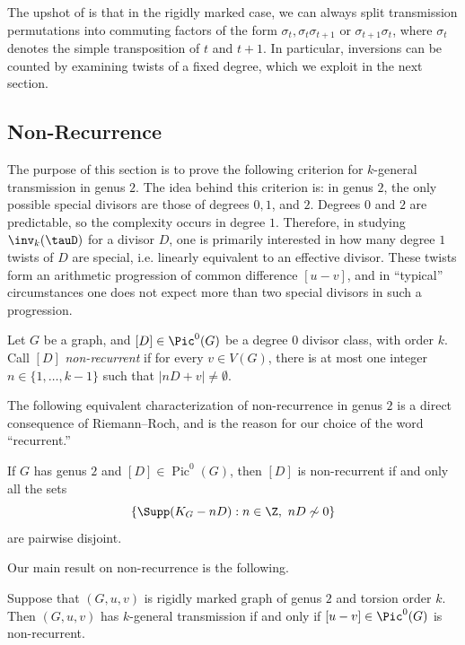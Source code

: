 The upshot of  is that in the rigidly marked case, we can always split transmission permutations into commuting factors of the form $\sigma_t, \sigma_t\sigma_{t+1}$ or $\sigma_{t+1}\sigma_t$, where $\sigma_t$ denotes the simple transposition of $t$ and $t+1$. In particular, inversions can be counted by examining twists of a fixed degree, which we exploit in the next section.


\subsection{Non-Recurrence}

The purpose of this section is to prove the following criterion for $k$-general transmission in genus $2$. The idea behind this criterion is: in genus $2$, the only possible special divisors are those of degrees $0,1$, and $2$. Degrees $0$ and $2$ are predictable, so the complexity occurs in degree $1$. Therefore, in studying $\inv_k(\tauD)$ for a divisor $D$, one is primarily interested in how many degree $1$ twists of $D$ are special, i.e. linearly equivalent to an effective divisor. These twists form an arithmetic progression of common difference $[u-v]$, and in ``typical'' circumstances one does not expect more than two special divisors in such a progression.

\begin{defi}
Let $G$ be a graph, and $[D] \in \Pic^0(G)$ be a degree $0$ divisor class, with order $k$. Call $[D]$ \emph{non-recurrent} if for every $v \in V(G)$, there is at most one integer $n \in \{1,\ldots,k-1\}$ such that $|nD + v| \neq \emptyset$.
\end{defi}

The following equivalent characterization of non-recurrence in genus $2$ is a direct consequence of Riemann--Roch, and is the reason for our choice of the word ``recurrent.''

\begin{lemma}\label{lem:nonrecDisjoint}
If $G$ has genus $2$ and $[D] \in \operatorname{Pic}^0(G)$, then $[D]$ is non-recurrent if and only all the sets $$\{ \Supp(K_G - nD): n \in \Z,\ n D \not\sim 0 \}$$ are pairwise disjoint.
\end{lemma}

Our main result on non-recurrence is the following.

\begin{theorem}
\label{thm:kgtThetas}
Suppose that $(G,u,v)$ is rigidly marked graph of genus $2$ and torsion order $k$. Then $(G,u,v)$ has $k$-general transmission if and only if $[u-v] \in \Pic^0(G)$ is non-recurrent.
\end{theorem}

